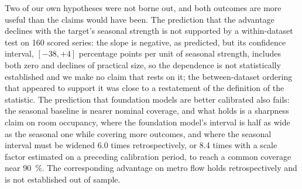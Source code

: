 \documentclass[utf8]{FrontiersinHarvard}
\newif\ifrevisionmarkup
\newcommand{\new}[1]{\ifrevisionmarkup\textcolor{revision}{#1}\else#1\fi}
\newif\ifsecondrevisionmarkup
\newcommand{\rev}[1]{\ifsecondrevisionmarkup\textcolor{revisiontwo}{#1}\else#1\fi}
\theoremstyle{plain}
\theoremstyle{definition}
\theoremstyle{remark}
\begin{document}
\new{Two of our own hypotheses \rev{were not borne out}, and both \rev{outcomes} are more useful than the claims would have been.} The prediction that the advantage declines with the target's seasonal strength \rev{is not supported by} a within-dataset test on \num{160} \new{scored} series\rev{: the slope is negative, as predicted, but its confidence interval, $[-38,+4]$ percentage points per unit of seasonal strength, includes both zero and declines of practical size, so the dependence is not statistically established and we make no claim that rests on it}; the between-dataset ordering that appeared to support it was close to a restatement of the definition of the statistic. \new{The prediction that foundation models are better calibrated \rev{also fails}: the seasonal baseline is nearer nominal coverage, and what \rev{holds} is a sharpness claim \rev{on room occupancy, where the foundation model's interval is half as wide as the seasonal one while covering more outcomes, and where the seasonal interval must be widened \num{6.0} times retrospectively, or \num{8.4} times with a scale factor estimated on a preceding calibration period, to reach a common coverage near \SI{90}{\percent}. The corresponding advantage on metro flow holds retrospectively and is not established out of sample}.}
\end{document}
